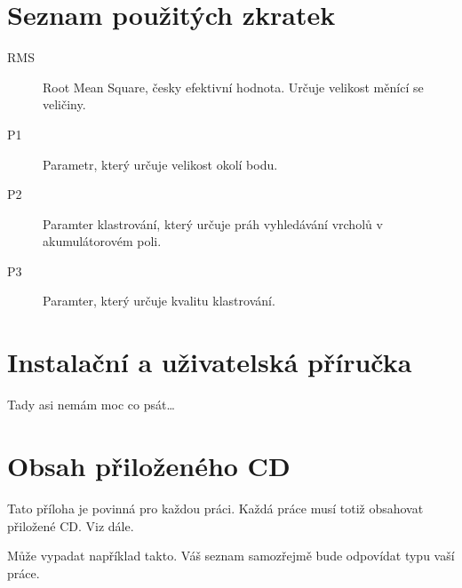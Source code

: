 \documentclass[11pt,twoside,a4paper]{book}
\begin{document}
%

\appendix

\chapter{Seznam použitých zkratek}
\label{chap:zkratky}

\begin{description}
\item[RMS] Root Mean Square, česky efektivní hodnota. Určuje velikost měnící se veličiny.
\item[P1] Parametr, který určuje velikost okolí bodu.
\item[P2] Paramter klastrování, který určuje práh vyhledávání vrcholů v akumulátorovém poli.
\item[P3] Paramter, který určuje kvalitu klastrování.
\end{description}


\chapter{Instalační a uživatelská příručka}
Tady asi nemám moc co psát\ldots


\chapter{Obsah přiloženého CD}
\label{chap:CD}
Tato příloha je povinná pro každou práci. Každá práce musí totiž obsahovat přiložené CD. Viz dále.

Může vypadat například takto. Váš seznam samozřejmě bude odpovídat typu vaší práce.

\end{document}
